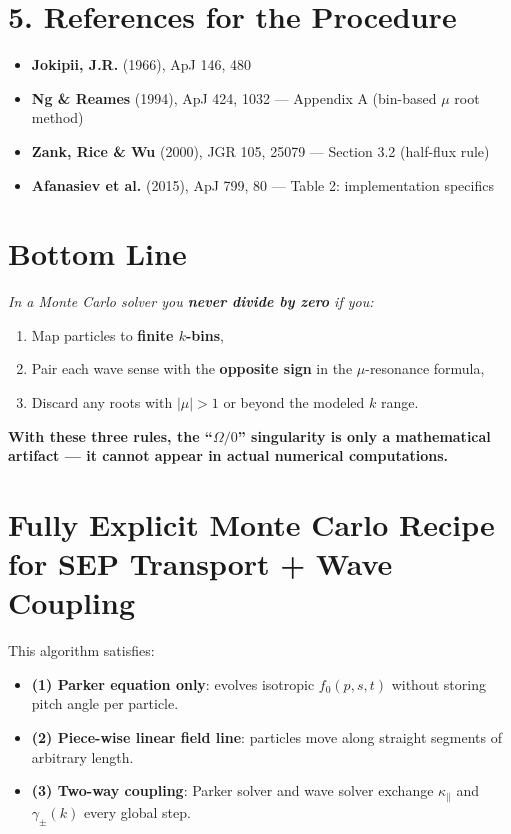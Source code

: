 \section*{5. References for the Procedure}

\begin{itemize}
    \item \textbf{Jokipii, J.R.} (1966), ApJ 146, 480
    \item \textbf{Ng \& Reames} (1994), ApJ 424, 1032 — Appendix A (bin-based $\mu$ root method)
    \item \textbf{Zank, Rice \& Wu} (2000), JGR 105, 25079 — Section 3.2 (half-flux rule)
    \item \textbf{Afanasiev et al.} (2015), ApJ 799, 80 — Table 2: implementation specifics
\end{itemize}

\section*{Bottom Line}

\textit{In a Monte Carlo solver you \textbf{never divide by zero} if you:}

\begin{enumerate}
    \item Map particles to \textbf{finite $k$-bins},
    \item Pair each wave sense with the \textbf{opposite sign} in the $\mu$-resonance formula,
    \item Discard any roots with $|\mu| > 1$ or beyond the modeled $k$ range.
\end{enumerate}

\begin{tcolorbox}[colback=gray!10]
\textbf{With these three rules, the ``$\Omega/0$'' singularity is only a mathematical artifact — it cannot appear in actual numerical computations.}
\end{tcolorbox}

\section*{Fully Explicit Monte Carlo Recipe for SEP Transport + Wave Coupling}

This algorithm satisfies:

\begin{itemize}
    \item \textbf{(1) Parker equation only}: evolves isotropic $f_0(p, s, t)$ without storing pitch angle per particle.
    \item \textbf{(2) Piece-wise linear field line}: particles move along straight segments of arbitrary length.
    \item \textbf{(3) Two-way coupling}: Parker solver and wave solver exchange $\kappa_\parallel$ and $\gamma_\pm(k)$ every global step.
\end{itemize}

